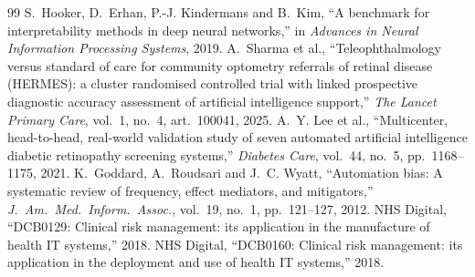\documentclass[11pt,a4paper]{article}
\begin{document}
\begin{thebibliography}{99}
 S.~Hooker, D.~Erhan, P.-J. Kindermans and B.~Kim, ``A benchmark for interpretability methods in deep neural networks,'' in \emph{Advances in Neural Information Processing Systems}, 2019.
 A.~Sharma et al., ``Teleophthalmology versus standard of care for community optometry referrals of retinal disease (HERMES): a cluster randomised controlled trial with linked prospective diagnostic accuracy assessment of artificial intelligence support,'' \emph{The Lancet Primary Care}, vol.~1, no.~4, art.~100041, 2025.
 A.~Y. Lee et al., ``Multicenter, head-to-head, real-world validation study of seven automated artificial intelligence diabetic retinopathy screening systems,'' \emph{Diabetes Care}, vol.~44, no.~5, pp.~1168--1175, 2021.
 K.~Goddard, A.~Roudsari and J.~C. Wyatt, ``Automation bias: A systematic review of frequency, effect mediators, and mitigators,'' \emph{J.\ Am.\ Med.\ Inform.\ Assoc.}, vol.~19, no.~1, pp.~121--127, 2012.
 NHS Digital, ``DCB0129: Clinical risk management: its application in the manufacture of health IT systems,'' 2018.
 NHS Digital, ``DCB0160: Clinical risk management: its application in the deployment and use of health IT systems,'' 2018.
\end{thebibliography}
\end{document}
